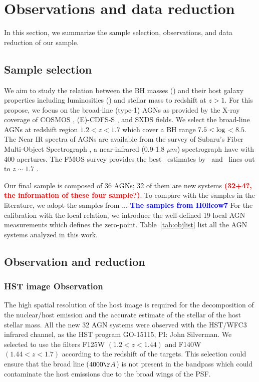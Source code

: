 \documentclass[apj]{emulateapj}
\begin{document}
\section{Observations and data reduction}
\label{sec:data}
In this section, we summarize the sample selection, observations, and data reduction of our sample. 

\subsection{Sample selection}

We aim to study the relation between the BH masses (\mbh) and their host galaxy properties including luminosities (\lhost) and stellar mass to redshift at $z>1$. For this propose, we focus on the broad-line (type-1) AGNs as provided by the X-ray coverage of COSMOS \citep{Civano2016}, (E)-CDFS-S \citep{Lehmer2005, Xue2011}, and SXDS \citep{Ueda2008} fields. We select the broad-line AGNs at redshift region $1.2<z<1.7$ which cover a BH range $7.5<{\rm log}$\mbh $<8.5$. The Near IR spectra of AGNs are available from the survey of Subaru's Fiber Multi-Object Spectrograph \citep[FMOS, ][]{Kimura2010, Schulze2018}, a near-infrared (0.9-1.8 $\mu m$) spectrograph have with 400 apertures. The FMOS survey provides the best \mbh\ estimates by \halpha\ and \hbeta\ lines out to $z\sim1.7$ \citep{Greene2005, Matsuoka2013, Nobuta2012}.

Our final sample is composed of 36  AGNs; 32 of them are new systems \textcolor{red}{\bf (32+4?, the information of these four sample?)}. To compare with the samples in the literature, we adopt the samples from ... \textcolor{blue}{\bf The samples from H0licow7}
For the calibration with the local relation, we introduce the well-defined 19 local AGN measurements \citep{Ben++10, Peterson2004} which defines the zero-point. Table~\ref{tab:objlist} list all the AGN systems analyzed in this work.

\subsection{Observation and reduction}
\label{observation}
\subsubsection{HST image Observation}
The high spatial resolution of the host image is required for the decomposition of the nuclear/host emission and the accurate estimate of the stellar of the host stellar mass. All the new 32 AGN systems were observed with the HST/WFC3 infrared channel, as the HST program GO-15115, PI: John Silverman. We selected to use the filters F125W $(1.2<z<1.44)$ and F140W $(1.44<z<1.7)$ according to the redshift of the targets. This selection could ensure that the broad \halpha line ($4000\AA$) is not present in the bandpass which could contaminate the host emissions due to the broad wings of the PSF.
\end{document}
